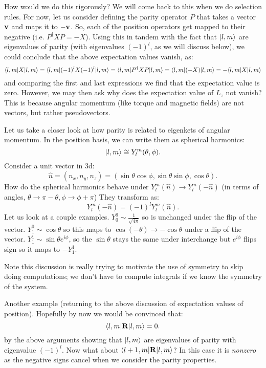 How would we do this rigorously? We will come back to this when we do selection rules. For now, let us consider defining the parity operator $P$ that takes a vector $\mathbf{v}$ and maps it to $-\mathbf{v}$. So, each of the position operators get mapped to their negative (i.e. $P^\dagger XP= -X$). Using this in tandem with the fact that $\lvert l, m \rangle$ are eigenvalues of parity (with eigenvalues $(-1)^l$, as we will discuss below), we could conclude that the above expectation values vanish, as:
\begin{equation}
    \langle l, m \rvert X \lvert l, m \rangle = \langle l, m \rvert(-1)^l X (-1)^l \lvert l, m \rangle = \langle l, m \rvert P^\dagger X P\lvert l, m \rangle = \langle l, m \rvert(-X)\lvert l, m \rangle = -\langle l, m \rvert X\lvert l, m \rangle
\end{equation}
and comparing the first and last expressions we find that the expectation value is zero. However, we may then ask why does the expectation value of $L_z$ not vanish? This is because angular momentum (like torque and magnetic fields) are not vectors, but rather pseudovectors.

Let us take a closer look at how parity is related to eigenkets of angular momentum. In the position basis, we can write them as spherical harmonics:
\begin{equation}
    \ket{l, m} \cong Y_{l}^m(\theta, \phi).
\end{equation}
Consider a unit vector in 3d:
\begin{equation}
    \hat{n} = (n_x, n_y, n_z) = (\sin\theta\cos\phi, \sin\theta\sin\phi, \cos\theta).
\end{equation}
How do the spherical harmonics behave under $Y_l^m(\hat{n}) \to Y_l^m(-\hat{n})$ (in terms of angles, $\theta \to \pi - \theta, \phi \to \phi + \pi$) They transform as:
\begin{equation}
    Y_l^m(-\hat{n}) = (-1)^lY_{l}^m(\hat{n}).
\end{equation}
Let us look at a couple examples. $Y_0^0 \sim \frac{1}{\sqrt{4\pi}}$ so is unchanged under the flip of the vector. $Y_1^0 \sim \cos\theta$ so this maps to $\cos(-\theta) \to -\cos\theta$ under a flip of the vector. $Y_1^1 \sim \sin\theta e^{i\phi}$, so the $\sin\theta$ stays the same under interchange but $e^{i\phi}$ flips sign so it maps to $-Y_1^1$. 

Note this discussion is really trying to motivate the use of symmetry to skip doing computations; we don't have to compute integrals if we know the symmetry of the system.

Another example (returning to the above discussion of expectation values of position). Hopefully by now we would be convinced that:
\begin{equation}
    \langle l, m \rvert\mathbf{R}\lvert l, m \rangle  = 0.
\end{equation}
by the above arguments showing that $\lvert l, m \rangle$ are eigenvalues of parity with eigenvalue $(-1)^l$. Now what about $\langle l+1, m \rvert\mathbf{R}\lvert l, m \rangle$? In this case it is \emph{nonzero} as the negative signs cancel when we consider the parity properties.

